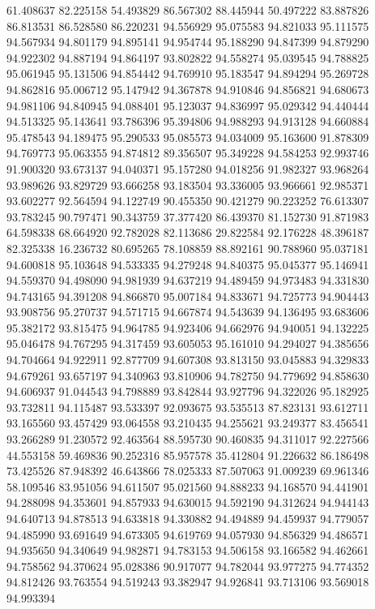61.408637
82.225158
54.493829
86.567302
88.445944
50.497222
83.887826
86.813531
86.528580
86.220231
94.556929
95.075583
94.821033
95.111575
94.567934
94.801179
94.895141
94.954744
95.188290
94.847399
94.879290
94.922302
94.887194
94.864197
93.802822
94.558274
95.039545
94.788825
95.061945
95.131506
94.854442
94.769910
95.183547
94.894294
95.269728
94.862816
95.006712
95.147942
94.367878
94.910846
94.856821
94.680673
94.981106
94.840945
94.088401
95.123037
94.836997
95.029342
94.440444
94.513325
95.143641
93.786396
95.394806
94.988293
94.913128
94.660884
95.478543
94.189475
95.290533
95.085573
94.034009
95.163600
91.878309
94.769773
95.063355
94.874812
89.356507
95.349228
94.584253
92.993746
91.900320
93.673137
94.040371
95.157280
94.018256
91.982327
93.968264
93.989626
93.829729
93.666258
93.183504
93.336005
93.966661
92.985371
93.602277
92.564594
94.122749
90.455350
90.421279
90.223252
76.613307
93.783245
90.797471
90.343759
37.377420
86.439370
81.152730
91.871983
64.598338
68.664920
92.782028
82.113686
29.822584
92.176228
48.396187
82.325338
16.236732
80.695265
78.108859
88.892161
90.788960
95.037181
94.600818
95.103648
94.533335
94.279248
94.840375
95.045377
95.146941
94.559370
94.498090
94.981939
94.637219
94.489459
94.973483
94.331830
94.743165
94.391208
94.866870
95.007184
94.833671
94.725773
94.904443
93.908756
95.270737
94.571715
94.667874
94.543639
94.136495
93.683606
95.382172
93.815475
94.964785
94.923406
94.662976
94.940051
94.132225
95.046478
94.767295
94.317459
93.605053
95.161010
94.294027
94.385656
94.704664
94.922911
92.877709
94.607308
93.813150
93.045883
94.329833
94.679261
93.657197
94.340963
93.810906
94.782750
94.779692
94.858630
94.606937
91.044543
94.798889
93.842844
93.927796
94.322026
95.182925
93.732811
94.115487
93.533397
92.093675
93.535513
87.823131
93.612711
93.165560
93.457429
93.064558
93.210435
94.255621
93.249377
83.456541
93.266289
91.230572
92.463564
88.595730
90.460835
94.311017
92.227566
44.553158
59.469836
90.252316
85.957578
35.412804
91.226632
86.186498
73.425526
87.948392
46.643866
78.025333
87.507063
91.009239
69.961346
58.109546
83.951056
94.611507
95.021560
94.888233
94.168570
94.441901
94.288098
94.353601
94.857933
94.630015
94.592190
94.312624
94.944143
94.640713
94.878513
94.633818
94.330882
94.494889
94.459937
94.779057
94.485990
93.691649
94.673305
94.619769
94.057930
94.856329
94.486571
94.935650
94.340649
94.982871
94.783153
94.506158
93.166582
94.462661
94.758562
94.370624
95.028386
90.917077
94.782044
93.977275
94.774352
94.812426
93.763554
94.519243
93.382947
94.926841
93.713106
93.569018
94.993394
